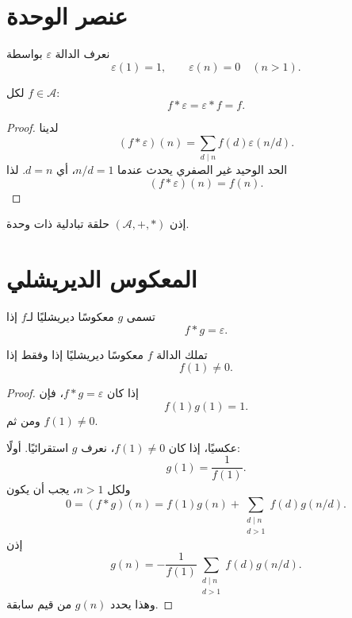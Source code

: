 \section{عنصر الوحدة}

\begin{definition}
نعرف الدالة \(\varepsilon\) بواسطة
\[
\varepsilon(1)=1,
\qquad
\varepsilon(n)=0
\quad(n>1).
\]
\end{definition}

\begin{proposition}
\label{prop:dirichlet-convolution-identity}
\provedhere
لكل \(f\in\mathcal{A}\):
\[
f*\varepsilon=\varepsilon*f=f.
\]
\end{proposition}

\begin{proof}
لدينا
\[
(f*\varepsilon)(n)
=
\sum_{d\mid n}f(d)\varepsilon(n/d).
\]
الحد الوحيد غير الصفري يحدث عندما \(n/d=1\)، أي \(d=n\). لذا
\[
(f*\varepsilon)(n)=f(n).
\]
\end{proof}

إذن \((\mathcal{A},+,*)\) حلقة تبادلية ذات وحدة.

\section{المعكوس الديريشلي}

\begin{definition}
تسمى \(g\) معكوسًا ديريشليًا لـ\(f\) إذا
\[
f*g=\varepsilon.
\]
\end{definition}

\begin{theorem}
\label{thm:dirichlet-inverse-criterion}
\provedhere
تملك الدالة \(f\) معكوسًا ديريشليًا إذا وفقط إذا
\[
f(1)\neq0.
\]
\end{theorem}

\begin{proof}
إذا كان \(f*g=\varepsilon\)، فإن
\[
f(1)g(1)=1.
\]
ومن ثم \(f(1)\neq0\).

عكسيًا، إذا كان \(f(1)\neq0\)، نعرف \(g\) استقرائيًا. أولًا:
\[
g(1)=\frac1{f(1)}.
\]
ولكل \(n>1\)، يجب أن يكون
\[
0=(f*g)(n)
=
f(1)g(n)
+
\sum_{\substack{d\mid n\\d>1}}f(d)g(n/d).
\]
إذن
\[
g(n)
=
-\frac1{f(1)}
\sum_{\substack{d\mid n\\d>1}}f(d)g(n/d).
\]
وهذا يحدد \(g(n)\) من قيم سابقة.
\end{proof}

